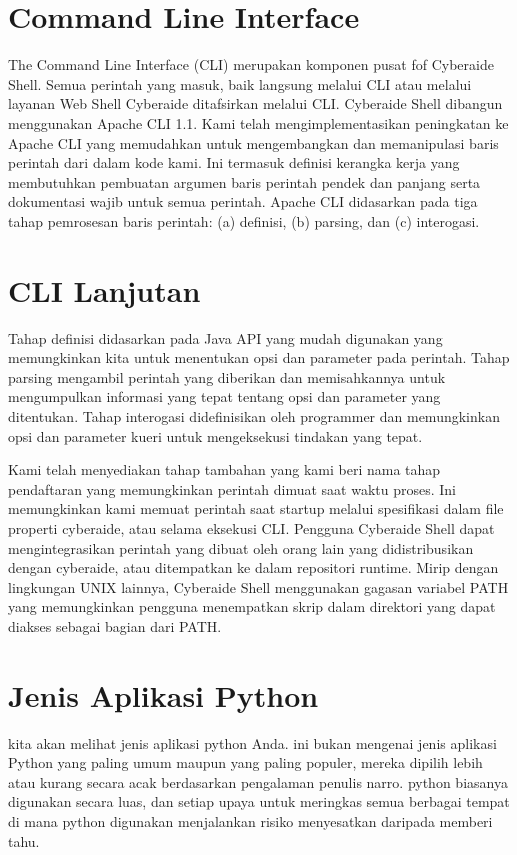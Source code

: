 \documentclass[12pt, times new roman, a4paper]{article}
\begin{document}
\section{Command Line Interface}
The Command Line Interface (CLI) merupakan komponen pusat fof Cyberaide Shell. Semua perintah yang masuk, baik langsung melalui CLI atau melalui layanan Web Shell Cyberaide ditafsirkan melalui CLI. Cyberaide Shell dibangun menggunakan Apache CLI 1.1. Kami telah mengimplementasikan peningkatan ke Apache CLI yang memudahkan untuk mengembangkan dan memanipulasi baris perintah dari dalam kode kami. Ini termasuk definisi kerangka kerja yang membutuhkan pembuatan argumen baris perintah pendek dan panjang serta dokumentasi wajib untuk semua perintah. Apache CLI didasarkan pada tiga tahap pemrosesan baris perintah: (a) definisi, (b) parsing, dan (c) interogasi.

\section{CLI Lanjutan}
Tahap definisi didasarkan pada Java API yang mudah digunakan yang memungkinkan kita untuk menentukan opsi dan parameter pada perintah. Tahap parsing mengambil perintah yang diberikan dan memisahkannya untuk mengumpulkan informasi yang tepat tentang opsi dan parameter yang ditentukan. Tahap interogasi didefinisikan oleh programmer dan memungkinkan opsi dan parameter kueri untuk mengeksekusi tindakan yang tepat.

Kami telah menyediakan tahap tambahan yang kami beri nama tahap pendaftaran yang memungkinkan perintah dimuat saat waktu proses. Ini memungkinkan kami memuat perintah saat startup melalui spesifikasi dalam file properti cyberaide, atau selama eksekusi CLI. Pengguna Cyberaide Shell dapat mengintegrasikan perintah yang dibuat oleh orang lain yang didistribusikan dengan cyberaide, atau ditempatkan ke dalam repositori runtime. Mirip dengan lingkungan UNIX lainnya, Cyberaide Shell menggunakan gagasan variabel PATH yang memungkinkan pengguna menempatkan skrip dalam direktori yang dapat diakses sebagai bagian dari PATH. 

\section{Jenis Aplikasi Python}
kita akan melihat jenis aplikasi python Anda. ini bukan mengenai jenis aplikasi Python yang paling umum maupun yang paling populer, mereka dipilih lebih atau kurang secara acak berdasarkan pengalaman penulis narro. python biasanya digunakan secara luas, dan setiap upaya untuk meringkas semua berbagai tempat di mana python digunakan menjalankan risiko menyesatkan daripada memberi tahu.
\end{document}
